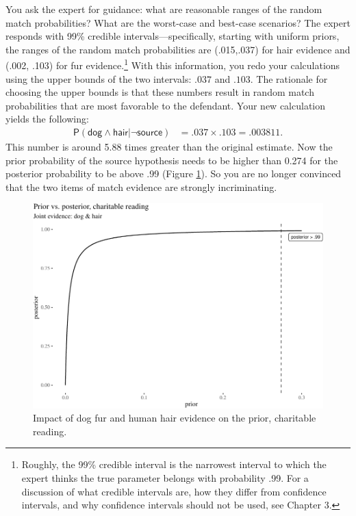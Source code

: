 \documentclass[
  10pt,
  dvipsnames,enabledeprecatedfontcommands]{scrartcl}
\newcommand{\s}[1]{\mbox{$\mathsf{#1}$}}
\begin{document}
You ask the expert for guidance: what are reasonable ranges of the
random match probabilities? What are the worst-case and best-case
scenarios? The expert responds with 99\% credible
intervals---specifically, starting with uniform priors, the ranges of
the random match probabilities are (.015,.037) for hair evidence and
(.002, .103) for fur evidence.\footnote{Roughly, the 99\% credible
  interval is the narrowest interval to which the expert thinks the true
  parameter belongs with probability .99. For a discussion of what
  credible intervals are, how they differ from confidence intervals, and
  why confidence intervals should not be used, see Chapter 3.} With this
information, you redo your calculations using the upper bounds of the
two intervals: \(.037\) and \(.103\). The rationale for choosing the
upper bounds is that these numbers result in random match probabilities
that are most favorable to the defendant. Your new calculation yields
the following: \begin{align*}
\mathsf{P}(\s{dog}\wedge \s{hair} \vert \neg \s{source})   & =  .037 \times .103 =.003811.
\end{align*} This number is around 5.88 times greater than the original
estimate. Now the prior probability of the source hypothesis needs to be
higher than 0.274 for the posterior probability to be above .99 (Figure
\ref{fig:impactOfCharitable}). So you are no longer convinced that the
two items of match evidence are strongly incriminating.

\begin{figure}[H]

\begin{center}\includegraphics[width=0.6\linewidth]{imprecision_philosophical_paper._files/figure-latex/fig:charitableImpact7-1} \end{center}
\caption{Impact of dog fur and human hair evidence on the prior, charitable reading.}
\label{fig:impactOfCharitable}
\end{figure}
\end{document}
